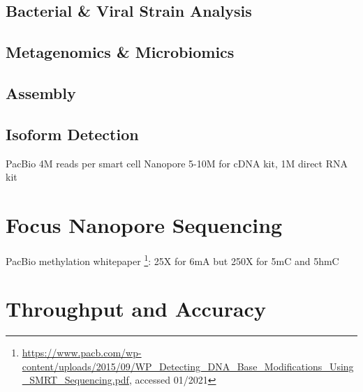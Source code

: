 \subsection{Bacterial \& Viral Strain Analysis}
\label{subsec:state_of_art:strain}



\subsection{Metagenomics \& Microbiomics}
\label{subsec:state_of_art:metagenomics}

\subsection{Assembly}
\label{subsec:state_of_art:assembly}

\subsection{Isoform Detection}
\label{subsec:state_of_art:isoform}

PacBio 4M reads per smart cell
Nanopore 5-10M for cDNA kit, 1M direct RNA kit




\section{Focus Nanopore Sequencing}
\label{sec:state_of_art:nanopore}

PacBio methylation whitepaper \footnote{\url{https://www.pacb.com/wp-content/uploads/2015/09/WP_Detecting_DNA_Base_Modifications_Using_SMRT_Sequencing.pdf}, accessed 01/2021}:
25X for 6mA but 250X for 5mC and 5hmC







\section{Throughput and Accuracy}
\label{sec:stat_of_art:throughput}


